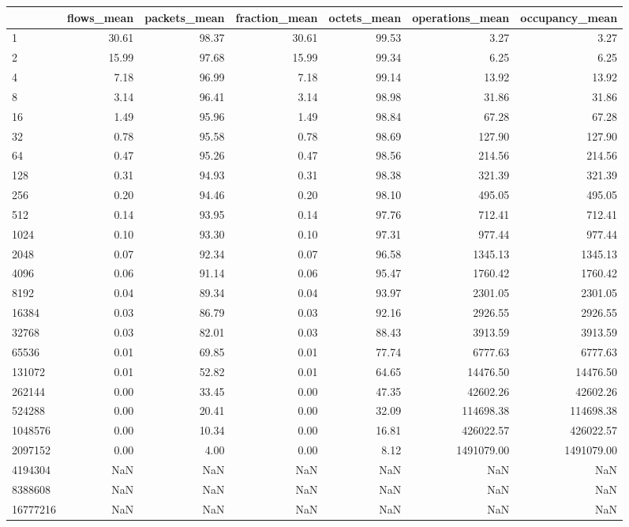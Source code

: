 \begin{tabular}{lrrrrrr}
\toprule
 & flows_mean & packets_mean & fraction_mean & octets_mean & operations_mean & occupancy_mean \\
\midrule
1 & 30.61 & 98.37 & 30.61 & 99.53 & 3.27 & 3.27 \\
2 & 15.99 & 97.68 & 15.99 & 99.34 & 6.25 & 6.25 \\
4 & 7.18 & 96.99 & 7.18 & 99.14 & 13.92 & 13.92 \\
8 & 3.14 & 96.41 & 3.14 & 98.98 & 31.86 & 31.86 \\
16 & 1.49 & 95.96 & 1.49 & 98.84 & 67.28 & 67.28 \\
32 & 0.78 & 95.58 & 0.78 & 98.69 & 127.90 & 127.90 \\
64 & 0.47 & 95.26 & 0.47 & 98.56 & 214.56 & 214.56 \\
128 & 0.31 & 94.93 & 0.31 & 98.38 & 321.39 & 321.39 \\
256 & 0.20 & 94.46 & 0.20 & 98.10 & 495.05 & 495.05 \\
512 & 0.14 & 93.95 & 0.14 & 97.76 & 712.41 & 712.41 \\
1024 & 0.10 & 93.30 & 0.10 & 97.31 & 977.44 & 977.44 \\
2048 & 0.07 & 92.34 & 0.07 & 96.58 & 1345.13 & 1345.13 \\
4096 & 0.06 & 91.14 & 0.06 & 95.47 & 1760.42 & 1760.42 \\
8192 & 0.04 & 89.34 & 0.04 & 93.97 & 2301.05 & 2301.05 \\
16384 & 0.03 & 86.79 & 0.03 & 92.16 & 2926.55 & 2926.55 \\
32768 & 0.03 & 82.01 & 0.03 & 88.43 & 3913.59 & 3913.59 \\
65536 & 0.01 & 69.85 & 0.01 & 77.74 & 6777.63 & 6777.63 \\
131072 & 0.01 & 52.82 & 0.01 & 64.65 & 14476.50 & 14476.50 \\
262144 & 0.00 & 33.45 & 0.00 & 47.35 & 42602.26 & 42602.26 \\
524288 & 0.00 & 20.41 & 0.00 & 32.09 & 114698.38 & 114698.38 \\
1048576 & 0.00 & 10.34 & 0.00 & 16.81 & 426022.57 & 426022.57 \\
2097152 & 0.00 & 4.00 & 0.00 & 8.12 & 1491079.00 & 1491079.00 \\
4194304 & NaN & NaN & NaN & NaN & NaN & NaN \\
8388608 & NaN & NaN & NaN & NaN & NaN & NaN \\
16777216 & NaN & NaN & NaN & NaN & NaN & NaN \\
\bottomrule
\end{tabular}
